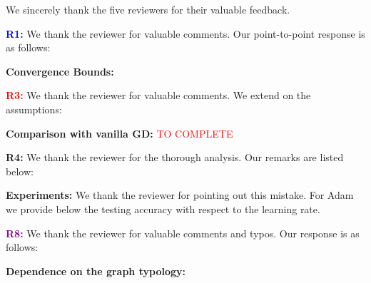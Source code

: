 \documentclass{article}
\begin{document}
We sincerely thank the five reviewers for their valuable feedback.


\vspace{0.01in}

\textbf{\textcolor{blue}{R1:}} We thank the reviewer for valuable comments. Our point-to-point response is as follows:\vspace{-5pt}

\textbf{Convergence Bounds:} 


\vspace{0.01in}


\textbf{\textcolor{red}{R3:}} We thank the reviewer for valuable comments. We extend on the assumptions:\vspace{-5pt}

\textbf{Comparison with vanilla GD:} \textcolor{red}{TO COMPLETE}


\vspace{0.01in}
\textbf{\textcolor{green!50!black}{R4:}} We thank the reviewer for the thorough analysis. Our remarks are listed below:\vspace{-5pt}

\textbf{Experiments:} 
We thank the reviewer for pointing out this mistake.
For Adam we provide below the testing accuracy with respect to the learning rate.

\vspace{0.01in}

\textbf{\textcolor{purple}{R8:}} We thank the reviewer for valuable comments and typos. Our response is as follows:\vspace{-5pt}

\textbf{Dependence on the graph typology:} 
\end{document}
